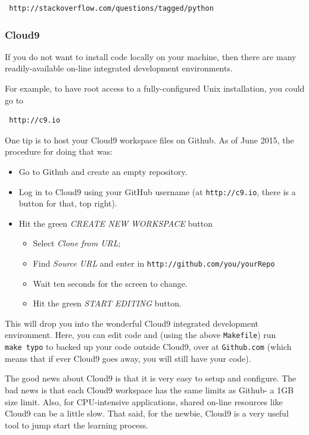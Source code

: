 \begin{lstlisting}
 http://stackoverflow.com/questions/tagged/python
\end{lstlisting}

\subsubsection{Cloud9}\label{cloud9}

If you do not want to install code locally on your machine, then there
are many readily-available on-line integrated development environments.

For example, to have root access to a fully-configured Unix
installation, you could go to

\begin{lstlisting}
 http://c9.io
\end{lstlisting}

One tip is to host your Cloud9 workspace files on Github. As of June
2015, the procedure for doing that was:

\begin{itemize}
\itemsep1pt\parskip0pt
\item
  Go to Github and create an empty repository.
\item
  Log in to Cloud9 using your GitHub username (at \texttt{http://c9.io},
  there is a button for that, top right).
\item
  Hit the green \emph{CREATE NEW WORKSPACE} button

  \begin{itemize}
  \itemsep1pt\parskip0pt
  \item
    Select \emph{Clone from URL};
  \item
    Find \emph{Source URL} and enter in
    \texttt{http://github.com/you/yourRepo}
  \item
    Wait ten seconds for the screen to change.
  \item
    Hit the green \emph{START EDITING} button.
  \end{itemize}
\end{itemize}

This will drop you into the wonderful Cloud9 integrated development
environment. Here, you can edit code and (using the above
\texttt{Makefile}) run \texttt{make\ typo} to backed up your code
outside Cloud9, over at \texttt{Github.com} (which means that if ever
Cloud9 goes away, you will still have your code).

The good news about Cloud9 is that it is very easy to setup and
configure. The bad news is that each Cloud9 workspace has the same
limits as Github- a 1GB size limit. Also, for CPU-intensive
applications, shared on-line resources like Cloud9 can be a little slow.
That said, for the newbie, Cloud9 is a very useful tool to jump start
the learning process.

